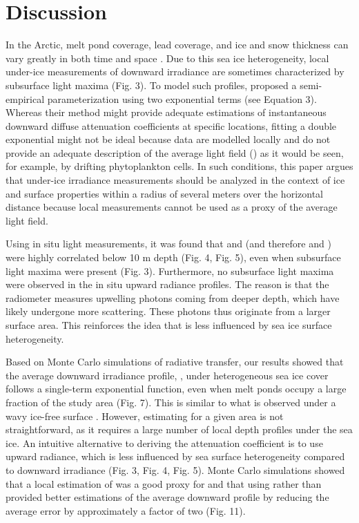 \section{Discussion}

In the Arctic, melt pond coverage, lead coverage, and ice and snow thickness can vary greatly in both time and space \citep{Landy2014,Eicken2004}. Due to this sea ice heterogeneity, local under-ice measurements of downward irradiance are sometimes characterized by subsurface light maxima (Fig. 3). To model such profiles, \citet{Laney2017} proposed a semi-empirical parameterization using two exponential terms (see Equation 3). Whereas their method might provide adequate estimations of instantaneous downward diffuse attenuation coefficients at specific locations, fitting a double exponential might not be ideal because data are modelled locally and do not provide an adequate description of the average light field (\meanedz{}) as it would be seen, for example, by drifting phytoplankton cells. In such conditions, this paper argues that under-ice irradiance measurements should be analyzed in the context of ice and surface properties within a radius of several meters over the horizontal distance because local measurements cannot be used as a proxy of the average light field.

Using in situ light measurements, it was found that \ed{} and \lu{} (and therefore \ked{} and \klu{}) were highly correlated below 10 m depth (Fig. 4, Fig. 5), even when subsurface light maxima were present (Fig. 3). Furthermore, no subsurface light maxima were observed in the in situ upward radiance profiles. The reason is that the \lu{} radiometer measures upwelling photons coming from deeper depth, which have likely undergone more scattering.  These photons thus originate from a larger surface area. This reinforces the idea that \lu{} is less influenced by sea ice surface heterogeneity. 

Based on Monte Carlo simulations of radiative transfer, our results showed that the average downward irradiance profile, \meanedz{}, under heterogeneous sea ice cover follows a single-term exponential function, even when melt ponds occupy a large fraction of the study area (Fig. 7). This is similar to what is observed under a wavy ice-free surface \citep{Zaneveld2001}. However, estimating \meanedz{} for a given area is not straightforward, as it requires a large number of local depth profiles under the sea ice. An intuitive alternative to deriving the attenuation coefficient is to use upward radiance, which is less influenced by sea surface heterogeneity compared to downward irradiance (Fig. 3, Fig. 4, Fig. 5). Monte Carlo simulations showed that a local estimation of \klu{} was a good proxy for \meanked{} and that using \klu{} rather than \ked{} provided better estimations of the average downward profile by reducing the average error by approximately a factor of two (Fig. 11). 

